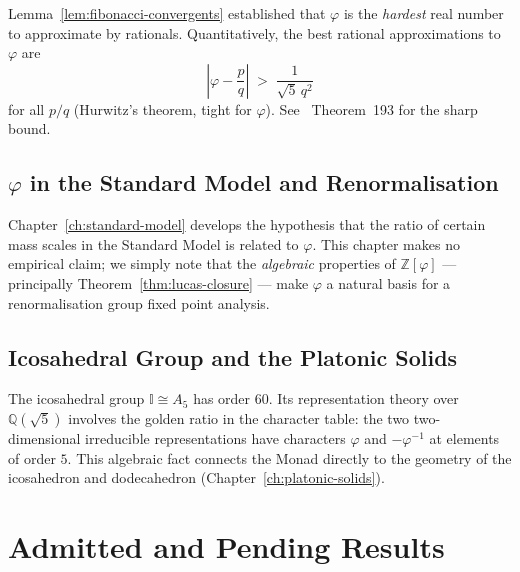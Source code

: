 Lemma~\ref{lem:fibonacci-convergents} established that $\varphi$
is the \emph{hardest} real number to approximate by rationals.
Quantitatively, the best rational approximations to $\varphi$ are
\[
  \left|\varphi - \frac{p}{q}\right| \;>\; \frac{1}{\sqrt{5}\,q^2}
\]
for all $p/q$ (Hurwitz's theorem, tight for $\varphi$).
See \cite{hardywright}~Theorem~193 for the sharp bound.

\subsection{$\varphi$ in the Standard Model and Renormalisation}

Chapter~\ref{ch:standard-model} develops the hypothesis that the
ratio of certain mass scales in the Standard Model is related to $\varphi$.
This chapter makes no empirical claim; we simply note that the
\emph{algebraic} properties of $\mathbb{Z}[\varphi]$ — principally
Theorem~\ref{thm:lucas-closure} — make $\varphi$ a natural basis for
a renormalisation group fixed point analysis.

\subsection{Icosahedral Group and the Platonic Solids}

The icosahedral group $\mathbb{I} \cong A_5$ has order $60$.  Its
representation theory over $\mathbb{Q}(\sqrt{5})$ involves the golden
ratio in the character table: the two two-dimensional irreducible
representations have characters $\varphi$ and $-\varphi^{-1}$ at
elements of order $5$.  This algebraic fact connects the Monad directly
to the geometry of the icosahedron and dodecahedron
(Chapter~\ref{ch:platonic-solids}).


\section{Admitted and Pending Results}
\label{sec:monad-admitted}

